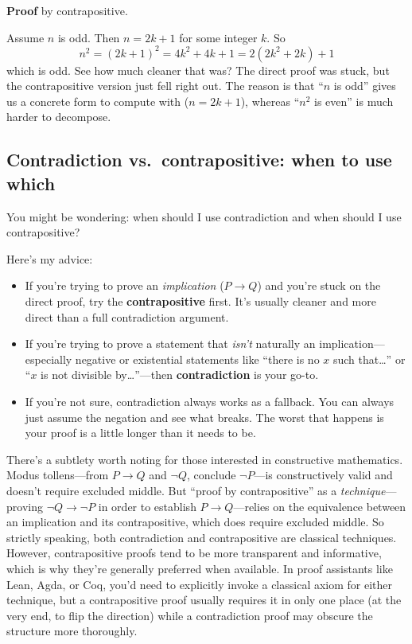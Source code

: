 \documentclass[11pt]{article}
\begin{document}
\textbf{Proof} by contrapositive.

Assume $n$ is odd. Then $n = 2k + 1$ for some integer $k$. So
\[
n^2 = (2k+1)^2 = 4k^2 + 4k + 1 = 2(2k^2 + 2k) + 1
\]
which is odd.
See how much cleaner that was? The direct proof was stuck, but the contrapositive version just fell right out. The reason is that ``$n$ is odd'' gives us a concrete form to compute with ($n = 2k+1$), whereas ``$n^2$ is even'' is much harder to decompose.

\subsection{Contradiction vs.\ contrapositive: when to use which}
You might be wondering: when should I use contradiction and when should I use contrapositive?

Here's my advice:
\begin{itemize}
  \item If you're trying to prove an \emph{implication} ($P \to Q$) and you're stuck on the direct proof, try the \textbf{contrapositive} first. It's usually cleaner and more direct than a full contradiction argument.
  \item If you're trying to prove a statement that \emph{isn't} naturally an implication---especially negative or existential statements like ``there is no $x$ such that\ldots'' or ``$x$ is not divisible by\ldots''---then \textbf{contradiction} is your go-to.
  \item If you're not sure, contradiction always works as a fallback. You can always just assume the negation and see what breaks. The worst that happens is your proof is a little longer than it needs to be.
\end{itemize}

There's a subtlety worth noting for those interested in constructive mathematics. Modus tollens---from $P \to Q$ and $\lnot Q$, conclude $\lnot P$---is constructively valid and doesn't require excluded middle. But ``proof by contrapositive'' as a \emph{technique}---proving $\lnot Q \to \lnot P$ in order to establish $P \to Q$---relies on the equivalence between an implication and its contrapositive, which does require excluded middle. So strictly speaking, both contradiction and contrapositive are classical techniques. However, contrapositive proofs tend to be more transparent and informative, which is why they're generally preferred when available. In proof assistants like Lean, Agda, or Coq, you'd need to explicitly invoke a classical axiom for either technique, but a contrapositive proof usually requires it in only one place (at the very end, to flip the direction) while a contradiction proof may obscure the structure more thoroughly.
\end{document}

